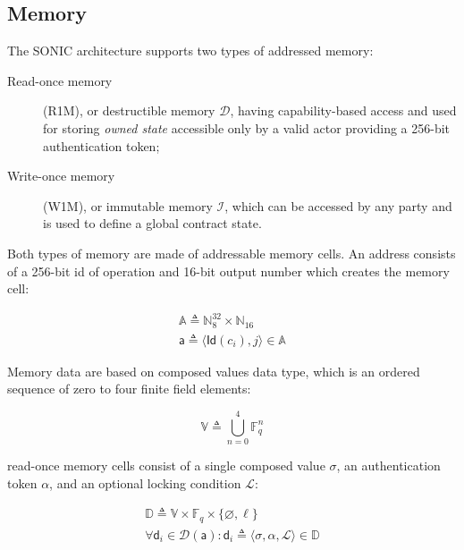 \documentclass[9pt,oneside]{amsart}
\begin{document}
\begin{multicols}{2}


\subsection{Memory}\label{Memory}

The SONIC architecture supports two types of addressed memory:
\begin{description}
    \item[Read-once memory] (R1M), or \gls{destructible memory} $\mathcal{D}$, having capability-based access
    and used for storing \emph{owned state} accessible only by a valid actor providing a 256-bit
    \gls{authentication token};

    \item[Write-once memory] (W1M), or \gls{immutable memory} $\mathcal{I}$, which can be accessed by any
    party and is used to define a global contract state.
\end{description}

Both types of memory are made of addressable memory cells.
An address consists of a 256-bit id of operation and 16-bit output number
which creates the memory cell:

\begin{gather}
\mathbb{A} \triangleq \mathbb{N}^{32}_8 \times \mathbb{N}_{16} \\
\mathsf{a} \triangleq \langle \mathsf{Id}(c_i), j \rangle \in \mathbb{A}
\end{gather}

Memory data are based on \glspl{composed value} data type,
which is an ordered sequence of zero to four finite field elements:

\begin{equation}
\mathbb{V} \triangleq \bigcup_{n=0}^{4} \mathbb{F}_q^n
\end{equation}

\Gls{read-once memory} cells consist of a single \gls{composed value} $\sigma$,
an \gls{authentication token} $\alpha$, and an optional \gls{locking condition} $\mathcal{L}$:

\begin{gather}
\mathbb{D} \triangleq \mathbb{V} \times \mathbb{F}_q \times \{ \varnothing, \ell \} \\
\forall \mathsf{d}_i \in \mathcal{D}(\mathsf{a}) : \mathsf{d}_i \triangleq \langle \sigma, \alpha, \mathcal{L} \rangle \in \mathbb{D}
\end{gather}


\end{multicols}
\end{document}
